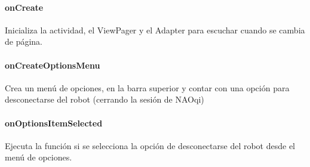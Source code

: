 \paragraph{onCreate}
\label{\detokenize{dev_docs:id8}}

\begin{fulllineitems}
\label{\detokenize{dev_docs:com.lar.cloudnao.MenuActivity.onCreate(Bundle)}}
Inicializa la actividad, el ViewPager y el Adapter para escuchar cuando se cambia de página.

\end{fulllineitems}



\paragraph{onCreateOptionsMenu}
\label{\detokenize{dev_docs:id9}}

\begin{fulllineitems}
\label{\detokenize{dev_docs:com.lar.cloudnao.MenuActivity.onCreateOptionsMenu(Menu)}}
Crea un menú de opciones, en la barra superior y contar con una opción para desconectarse del robot (cerrando la sesión de NAOqi)

\end{fulllineitems}



\paragraph{onOptionsItemSelected}
\label{\detokenize{dev_docs:id10}}

\begin{fulllineitems}
\label{\detokenize{dev_docs:com.lar.cloudnao.MenuActivity.onOptionsItemSelected(MenuItem)}}
Ejecuta la función  si se selecciona la opción de desconectarse del robot desde el menú de opciones.

\end{fulllineitems}



